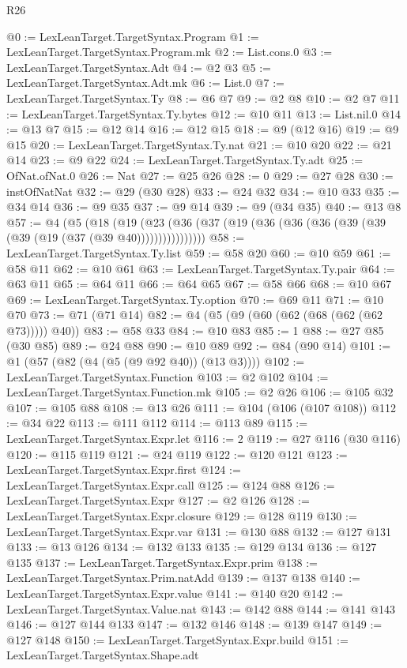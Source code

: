 \begin{lexlean}{R26}
\begin{coremodule}
@0 := LexLeanTarget.TargetSyntax.Program
@1 := LexLeanTarget.TargetSyntax.Program.mk
@2 := List.cons.{0}
@3 := LexLeanTarget.TargetSyntax.Adt
@4 := @2 @3
@5 := LexLeanTarget.TargetSyntax.Adt.mk
@6 := List.{0}
@7 := LexLeanTarget.TargetSyntax.Ty
@8 := @6 @7
@9 := @2 @8
@10 := @2 @7
@11 := LexLeanTarget.TargetSyntax.Ty.bytes
@12 := @10 @11
@13 := List.nil.{0}
@14 := @13 @7
@15 := @12 @14
@16 := @12 @15
@18 := @9 (@12 @16)
@19 := @9 @15
@20 := LexLeanTarget.TargetSyntax.Ty.nat
@21 := @10 @20
@22 := @21 @14
@23 := @9 @22
@24 := LexLeanTarget.TargetSyntax.Ty.adt
@25 := OfNat.ofNat.{0}
@26 := Nat
@27 := @25 @26
@28 := 0
@29 := @27 @28
@30 := instOfNatNat
@32 := @29 (@30 @28)
@33 := @24 @32
@34 := @10 @33
@35 := @34 @14
@36 := @9 @35
@37 := @9 @14
@39 := @9 (@34 @35)
@40 := @13 @8
@57 := @4
    (@5
      (@18 (@19 (@23 (@36 (@37 (@19 (@36 (@36 (@36 (@39 (@39 (@39 (@19 (@37 (@39 @40))))))))))))))))
@58 := LexLeanTarget.TargetSyntax.Ty.list
@59 := @58 @20
@60 := @10 @59
@61 := @58 @11
@62 := @10 @61
@63 := LexLeanTarget.TargetSyntax.Ty.pair
@64 := @63 @11
@65 := @64 @11
@66 := @64 @65
@67 := @58 @66
@68 := @10 @67
@69 := LexLeanTarget.TargetSyntax.Ty.option
@70 := @69 @11
@71 := @10 @70
@73 := @71 (@71 @14)
@82 := @4 (@5 (@9 (@60 (@62 (@68 (@62 (@62 @73))))) @40))
@83 := @58 @33
@84 := @10 @83
@85 := 1
@88 := @27 @85 (@30 @85)
@89 := @24 @88
@90 := @10 @89
@92 := @84 (@90 @14)
@101 := @1 (@57 (@82 (@4 (@5 (@9 @92 @40)) (@13 @3))))
@102 := LexLeanTarget.TargetSyntax.Function
@103 := @2 @102
@104 := LexLeanTarget.TargetSyntax.Function.mk
@105 := @2 @26
@106 := @105 @32
@107 := @105 @88
@108 := @13 @26
@111 := @104 (@106 (@107 @108))
@112 := @34 @22
@113 := @111 @112
@114 := @113 @89
@115 := LexLeanTarget.TargetSyntax.Expr.let
@116 := 2
@119 := @27 @116 (@30 @116)
@120 := @115 @119
@121 := @24 @119
@122 := @120 @121
@123 := LexLeanTarget.TargetSyntax.Expr.first
@124 := LexLeanTarget.TargetSyntax.Expr.call
@125 := @124 @88
@126 := LexLeanTarget.TargetSyntax.Expr
@127 := @2 @126
@128 := LexLeanTarget.TargetSyntax.Expr.closure
@129 := @128 @119
@130 := LexLeanTarget.TargetSyntax.Expr.var
@131 := @130 @88
@132 := @127 @131
@133 := @13 @126
@134 := @132 @133
@135 := @129 @134
@136 := @127 @135
@137 := LexLeanTarget.TargetSyntax.Expr.prim
@138 := LexLeanTarget.TargetSyntax.Prim.natAdd
@139 := @137 @138
@140 := LexLeanTarget.TargetSyntax.Expr.value
@141 := @140 @20
@142 := LexLeanTarget.TargetSyntax.Value.nat
@143 := @142 @88
@144 := @141 @143
@146 := @127 @144 @133
@147 := @132 @146
@148 := @139 @147
@149 := @127 @148
@150 := LexLeanTarget.TargetSyntax.Expr.build
@151 := LexLeanTarget.TargetSyntax.Shape.adt

\end{coremodule}
\end{lexlean}
